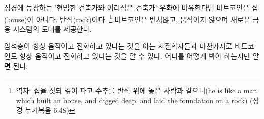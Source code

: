 \begin{comment}
	Arguably, in this parable of the wise and the foolish builders Bitcoin
	isn't the house. It is the rock. Unchangeable, unmoving, providing the
	foundation for a new financial system.
\end{comment}
성경에 등장하는 '현명한 건축가와 어리석은 건축가' 우화에 비유한다면 비트코인은 집(house)이 아니다. 반석(rock)이다.
\footnote{역자: 집을 짓되 깊이 파고 주추를 반석 위에 놓은 사람과 같으니(he is like a man which built an house, and digged deep, and laid the foundation on a rock) (성경 누가복음 6:48)}
비트코인은 변치않고, 움직이지 않으며 새로운 금융 시스템의 토대를 제공한다.

\begin{comment}
	Just like geologists, who know that rock formations are always moving
	and evolving, one can see that Bitcoin is always moving and evolving as
	well. You just have to know where to look and how to look at it.
\end{comment}
암석층이 항상 움직이고 진화하고 있다는 것을 아는 지질학자들과 마찬가지로
비트코인도 항상 움직이고 진화하고 있다는 것을 알 수 있다.
어디를 어떻게 봐야 하는지만 알면 된다.
		
